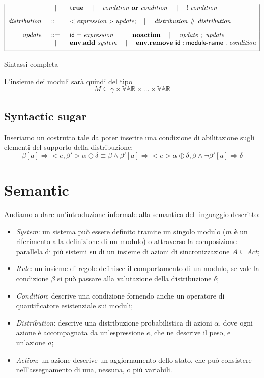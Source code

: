 \begin{table}
$$\begin{array}{|rcl|}
	& \quad\mid\quad & \mathbf{true} \quad\mid\quad \mathit{condition} \mbox{ } \mathbf{or} \mbox{ } \mathit{condition} \quad\mid\quad {\sf !} \mbox{ } \mathit{condition}
	\\[.3cm]
\mathit{distribution} &::=& <\mathit{expression}> \mathit{update}; \quad\mid\quad \mathit{distribution} \mbox{ } \# \mbox{ } \mathit{distribution}
	\\[.3cm]
\mathit{update} &::=& {\sf id} = \mathit{expression} \quad\mid\quad \mathbf{noaction} \quad\mid\quad \mathit{update} \mbox{ } ; \mbox{ } \mathit{update} \\
	& \quad\mid\quad & \mathbf{env.add} \mbox{ } \mathit{system} \quad\mid\quad \mathbf{env.remove} \mbox{ } {\sf id}:{\sf module}\textrm{-}{\sf name} \mbox{ } . \mbox{ } \mathit{condition} 
	\\[.2cm]
\hline
\end{array}
$$
\label{tab:sealsyntax}
\caption{Sintassi \seal{} completa}
\end{table}

L'insieme dei moduli sarà quindi del tipo
$$ M \subseteq \gamma \times \mathbb{VAR} \times \dots \times \mathbb{VAR} $$

\subsection{Syntactic sugar}
Inseriamo un costrutto tale da poter inserire una condizione di abilitazione sugli elementi del supporto della distribuzione:
$$
\beta [a]\Rightarrow <e,\beta'> \alpha \oplus \delta
\equiv 
\beta \wedge \beta' [a]\Rightarrow <e> \alpha \oplus \delta,
\beta \wedge \neg\beta' [a]\Rightarrow \delta
$$

\section{Semantic}
Andiamo a dare un'introduzione informale alla semantica del linguaggio descritto:
\begin{itemize}
	\item \emph{System}: un sistema può essere definito tramite un singolo modulo ($m$ è un riferimento alla definizione di un modulo) o attraverso la composizione parallela di più sistemi su di un insieme di azioni di sincronizzazione $A \subseteq Act$;
	\item \emph{Rule}: un insieme di regole definisce il comportamento di un modulo, se vale la condizione $\beta$ si può passare alla valutazione della distribuzione $\delta$;
	\item \emph{Condition}: descrive una condizione fornendo anche un operatore di quantificatore esistenziale sui moduli;
	\item \emph{Distribution}: descrive una distribuzione probabilistica di azioni $\alpha$, dove ogni azione è accompagnata da un'espressione $e$, che ne descrive il peso, e un'azione $a$;
	\item \emph{Action}: un azione descrive un aggiornamento dello stato, che può consistere nell'assegnamento di una, nessuna, o più variabili.
\end{itemize}

